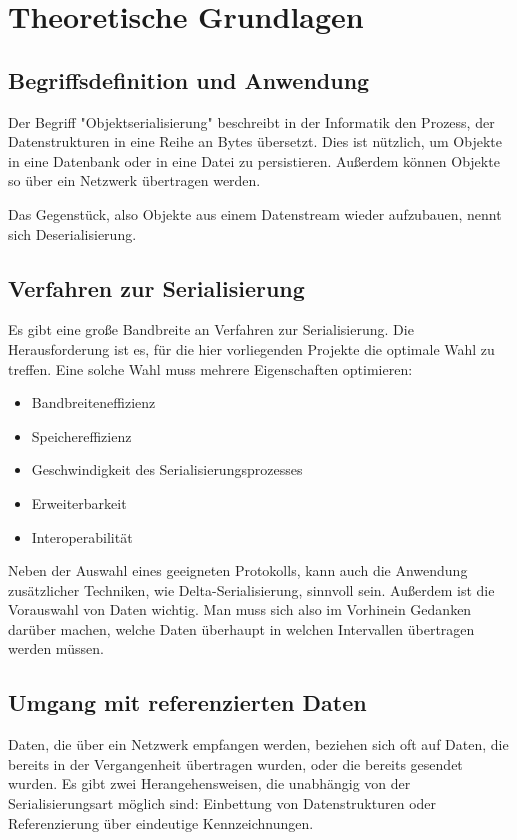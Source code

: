 
\chapter{Theoretische Grundlagen}
\section{Begriffsdefinition und Anwendung}

Der Begriff "Objektserialisierung" beschreibt in der Informatik den Prozess, der Datenstrukturen in eine Reihe an Bytes übersetzt. Dies ist nützlich, um Objekte in eine Datenbank oder in eine Datei zu persistieren. Außerdem können Objekte so über ein Netzwerk übertragen werden. \cite{SerialisationIntroduction}

Das Gegenstück, also Objekte aus einem Datenstream wieder aufzubauen, nennt sich Deserialisierung.

\section{Verfahren zur Serialisierung}

Es gibt eine große Bandbreite an Verfahren zur Serialisierung. Die Herausforderung ist es, für die hier vorliegenden Projekte die optimale Wahl zu treffen. Eine solche Wahl muss mehrere Eigenschaften optimieren:

\begin{itemize}
	\item Bandbreiteneffizienz
	\item Speichereffizienz
	\item Geschwindigkeit des Serialisierungsprozesses
	\item Erweiterbarkeit
	\item Interoperabilität
\end{itemize}

Neben der Auswahl eines geeigneten Protokolls, kann auch die Anwendung zusätzlicher Techniken, wie Delta-Serialisierung, sinnvoll sein. Außerdem ist die Vorauswahl von Daten wichtig. Man muss sich also im Vorhinein Gedanken darüber machen, welche Daten überhaupt in welchen Intervallen übertragen werden müssen.

\section{Umgang mit referenzierten Daten}

Daten, die über ein Netzwerk empfangen werden, beziehen sich oft auf Daten, die bereits in der Vergangenheit übertragen wurden, oder die bereits gesendet wurden. Es gibt zwei Herangehensweisen, die unabhängig von der Serialisierungsart möglich sind: Einbettung von Datenstrukturen oder Referenzierung über eindeutige Kennzeichnungen.


